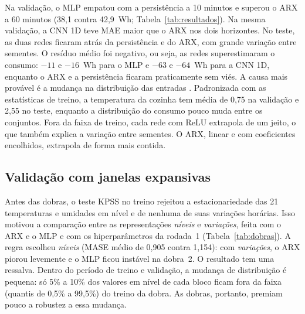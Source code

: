 \documentclass[11pt,a4paper]{article}
\begin{document}
Na validação, o MLP empatou com a persistência a 10 minutos e superou o ARX a 60 minutos (38,1 contra 42,9~Wh; Tabela~\ref{tab:resultados}). Na mesma validação, a CNN 1D teve MAE maior que o ARX nos dois horizontes. No teste, as duas redes ficaram atrás da persistência e do ARX, com grande variação entre sementes. O resíduo médio foi negativo, ou seja, as redes superestimaram o consumo: $-11$ e $-16$~Wh para o MLP e $-63$ e $-64$~Wh para a CNN 1D, enquanto o ARX e a persistência ficaram praticamente sem viés. A causa mais provável é a mudança na distribuição das entradas \citep{quinonero2009}. Padronizada com as estatísticas de treino, a temperatura da cozinha tem média de 0,75 na validação e 2,55 no teste, enquanto a distribuição do consumo pouco muda entre os conjuntos. Fora da faixa de treino, cada rede com ReLU extrapola de um jeito, o que também explica a variação entre sementes. O ARX, linear e com coeficientes encolhidos, extrapola de forma mais contida.

\begin{table}[!htbp]
  \centering\small
  \setlength{\tabcolsep}{4pt}
  \renewcommand{\arraystretch}{1.12}
  \caption{MAE (Wh) em treino, validação e teste e RMSE (Wh) no teste, para os horizontes de 10 e 60 minutos. Redes: média de 5 sementes, com o desvio-padrão do teste entre parênteses. ``---'': valor não registrado na execução final do notebook.}
  \label{tab:resultados}
  
\end{table}

\subsection{Validação com janelas expansivas}

Antes das dobras, o teste KPSS \citep{kpss1992} no treino rejeitou a estacionariedade das 21 temperaturas e umidades em nível e de nenhuma de suas variações horárias. Isso motivou a comparação entre as representações \emph{níveis} e \emph{variações}, feita com o ARX e o MLP e com os hiperparâmetros da rodada~1 (Tabela~\ref{tab:dobras}). A regra escolheu \emph{níveis} (MASE médio de 0,905 contra 1,154): com \emph{variações}, o ARX piorou levemente e o MLP ficou instável na dobra~2. O resultado tem uma ressalva. Dentro do período de treino e validação, a mudança de distribuição é pequena: só 5\% a 10\% dos valores em nível de cada bloco ficam fora da faixa (quantis de 0,5\% a 99,5\%) do treino da dobra. As dobras, portanto, premiam pouco a robustez a essa mudança.
\end{document}
